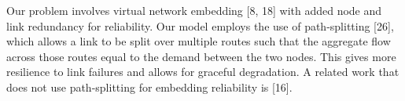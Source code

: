 Our problem involves virtual network embedding [8, 18]
with added node and link redundancy for reliability. Our
model employs the use of path-splitting [26], which allows a
link to be split over multiple routes such that the aggregate
flow across those routes equal to the demand between the
two nodes. This gives more resilience to link failures and
allows for graceful degradation. A related work that does
not use path-splitting for embedding reliability is [16].